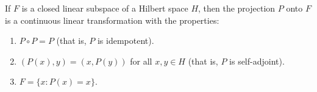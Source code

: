 If $F$ is a closed linear subspace of a Hilbert space $H$, then the projection $P$ onto $F$ is a continuous linear transformation with the properties:
\begin{enumerate}
\item[(i)] $P \circ P = P$ (that is, $P$ is idempotent).
\item[(ii)] $(P(x), y) = (x, P(y))$ for all $x, y \in H$ (that is, $P$ is self-adjoint).
\item[(iii)] $F = \{x : P(x) = x\}$.
\end{enumerate}
